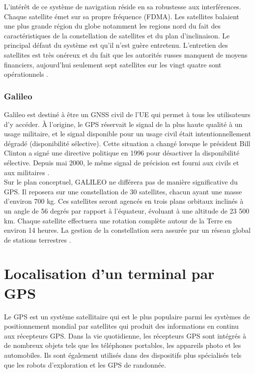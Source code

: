 L’intérêt de ce système de navigation réside en sa robustesse aux interférences. Chaque satellite émet sur sa propre fréquence (FDMA). Les satellites balaient une plus grande région du globe notamment les regions nord du fait des caractéristiques de la constellation de satellites et du plan d’inclinaison. Le principal défaut du système est qu’il n’est guère entretenu. L’entretien des satellites est très onéreux et du fait que les autorités russes manquent de moyens financiers, aujourd’hui seulement sept satellites sur les vingt quatre sont opérationnels \cite{frederic_evennou_techniques_2007}.

\subsubsection{Galileo}
Galileo est destiné à être un GNSS civil de l'UE qui permet à tous les utilisateurs d'y accéder. À l'origine, le GPS réservait le signal de la plus haute qualité à un usage militaire, et le signal disponible pour un usage civil était intentionnellement dégradé (disponibilité sélective). Cette situation a changé lorsque le président Bill Clinton a signé une directive politique en 1996 pour désactiver la disponibilité sélective. Depuis mai 2000, le même signal de précision est fourni aux civils et aux militaires \cite{bernhard_hofmann_wellenhof_gnss}.\\

Sur le plan conceptuel, GALILEO ne différera pas de manière significative du GPS. Il reposera sur une constellation de 30 satellites, chacun ayant une masse d'environ 700 kg. Ces satellites seront agencés en trois plans orbitaux inclinés à un angle de 56 degrés par rapport à l'équateur, évoluant à une altitude de 23 500 km. Chaque satellite effectuera une rotation complète autour de la Terre en environ 14 heures. La gestion de la constellation sera assurée par un réseau global de stations terrestres \cite{bernhard_hofmann_wellenhof_gnss}.

\section{Localisation d’un terminal par GPS}
Le GPS est un système satellitaire qui est le plus populaire parmi les systèmes de positionnement mondial par satellites qui produit des informations en continu aux récepteurs GPS. Dans la vie quotidienne, les récepteurs GPS sont intégrés à de nombreux objets tels que les téléphones portables, les appareils photo et les automobiles. Ils sont également utilisés dans des dispositifs plus spécialisés tels que les robots d'exploration et les GPS de randonnée.\\

